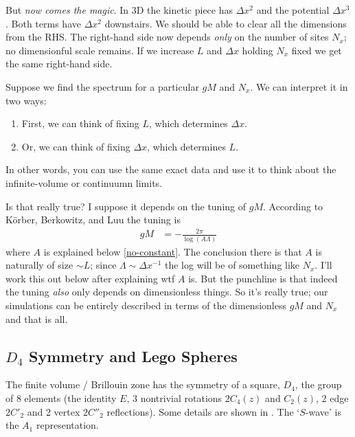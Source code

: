 But \emph{now comes the magic}.
In 3D the kinetic piece has $\Delta x^2$ and the potential $\Delta x^3$.
Both terms have $\Delta x^2$ downstairs.
We should be able to clear all the dimensions from the RHS.
The right-hand side now depends \emph{only} on the number of sites $N_x$; no dimensionful scale remains.
If we increase $L$ and $\Delta x$ holding $N_x$ fixed we get the same right-hand side.

Suppose we find the spectrum for a particular $gM$ and $N_x$.
We can interpret it in two ways:
\begin{enumerate}
	\item First, we can think of fixing $L$, which determines $\Delta x$.
	\item Or, we can think of fixing $\Delta x$, which determines $L$.
\end{enumerate}
In other words, you can use the same exact data and use it to think about the infinite-volume or continuumn limits.

Is that really true?  I suppose it depends on the tuning of $gM$.
According to K\"{o}rber, Berkowitz, and Luu the tuning is
\begin{align}
	gM &= - \frac{2\pi}{\log(A \Lambda)}
	\label{eq:tuning}
\end{align}
where $A$ is explained below \eqref{no-constant}.
The conclusion there is that $A$ is naturally of size $\sim L$; since $\Lambda\sim \Delta x^{-1}$ the log will be of something like $N_x$.
I'll work this out below after explaining wtf $A$ is.
But the punchline is that indeed the tuning \emph{also} only depends on dimensionless things.
So it's really true; our simulations can be entirely described in terms of the dimensionless $gM$ and $N_x$ and that is all.

\subsection{$D_4$ Symmetry and Lego Spheres}

The finite volume / Brillouin zone has the symmetry of a square, $D_4$, the group of 8 elements (the identity $E$, 3 nontrivial rotations $2C_4(z)$ and $C_2(z)$, 2 edge $2C'_2$ and 2 vertex $2C''_2$ reflections).
Some details are shown in .
The `$S$-wave' is the $A_1$ representation.


